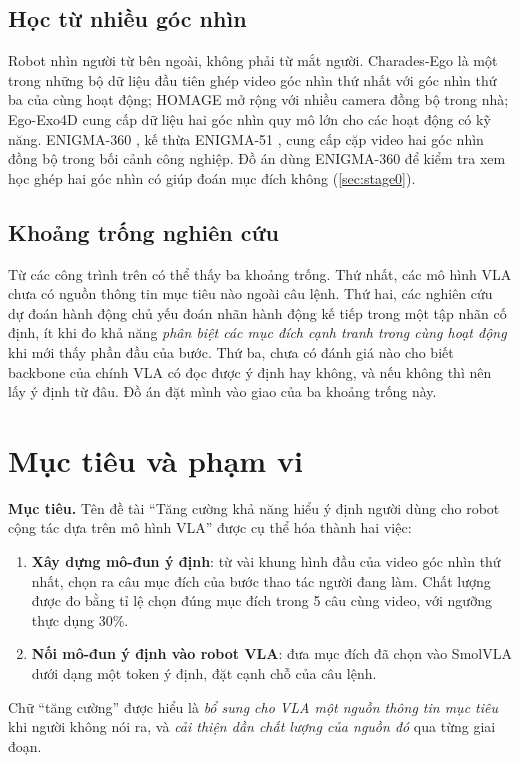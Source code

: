 \documentclass[a4paper,oneside]{report}
\newcommand{\ThesisTitleText}{Tăng cường khả năng hiểu ý định người dùng cho robot cộng tác dựa trên mô hình VLA}
\begin{document}
\subsection{Học từ nhiều góc nhìn}

Robot nhìn người từ bên ngoài, không phải từ mắt người. Charades-Ego \citep{sigurdsson2018charadesego} là một trong những bộ dữ liệu đầu tiên ghép video góc nhìn thứ nhất với góc nhìn thứ ba của cùng hoạt động; HOMAGE \citep{rai2021homage} mở rộng với nhiều camera đồng bộ trong nhà; Ego-Exo4D \citep{grauman2024egoexo4d} cung cấp dữ liệu hai góc nhìn quy mô lớn cho các hoạt động có kỹ năng. ENIGMA-360 \citep{ragusa2026enigma360}, kế thừa ENIGMA-51 \citep{ragusa2024enigma51}, cung cấp cặp video hai góc nhìn đồng bộ trong bối cảnh công nghiệp. Đồ án dùng ENIGMA-360 để kiểm tra xem học ghép hai góc nhìn có giúp đoán mục đích không (\cref{sec:stage0}).

\subsection{Khoảng trống nghiên cứu}

Từ các công trình trên có thể thấy ba khoảng trống. Thứ nhất, các mô hình VLA chưa có nguồn thông tin mục tiêu nào ngoài câu lệnh. Thứ hai, các nghiên cứu dự đoán hành động chủ yếu đoán nhãn hành động kế tiếp trong một tập nhãn cố định, ít khi đo khả năng \textit{phân biệt các mục đích cạnh tranh trong cùng hoạt động} khi mới thấy phần đầu của bước. Thứ ba, chưa có đánh giá nào cho biết backbone của chính VLA có đọc được ý định hay không, và nếu không thì nên lấy ý định từ đâu. Đồ án đặt mình vào giao của ba khoảng trống này.

\section{Mục tiêu và phạm vi}
\label{sec:muctieu}

\textbf{Mục tiêu.} Tên đề tài ``\ThesisTitleText'' được cụ thể hóa thành hai việc:
\begin{enumerate}
  \item \textbf{Xây dựng mô-đun ý định}: từ vài khung hình đầu của video góc nhìn thứ nhất, chọn ra câu mục đích của bước thao tác người đang làm. Chất lượng được đo bằng tỉ lệ chọn đúng mục đích trong 5 câu cùng video, với ngưỡng thực dụng 30\%.
  \item \textbf{Nối mô-đun ý định vào robot VLA}: đưa mục đích đã chọn vào SmolVLA dưới dạng một token ý định, đặt cạnh chỗ của câu lệnh.
\end{enumerate}
Chữ ``tăng cường'' được hiểu là \textit{bổ sung cho VLA một nguồn thông tin mục tiêu} khi người không nói ra, và \textit{cải thiện dần chất lượng của nguồn đó} qua từng giai đoạn.
\end{document}
